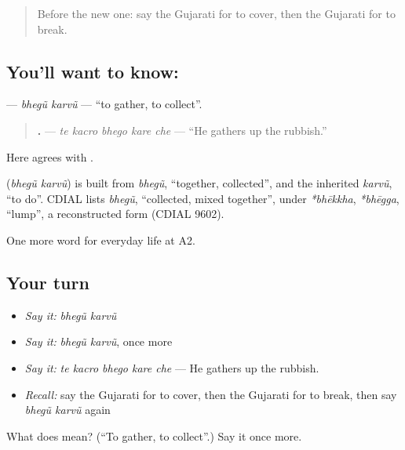 \label{lesson:GU-C161-bhegu-karvu}



\begin{quote}
Before the new one: say the Gujarati for to cover, then the Gujarati for to break.
\end{quote}

\subsection*{You'll want to know:  }
\textbf{ } — \emph{bhegũ karvũ} — \textquotedblleft{}to gather, to collect\textquotedblright{}.

\begin{quote}
\textbf{    .} — \emph{te kacro bhego kare che} — \textquotedblleft{}He gathers up the rubbish.\textquotedblright{}
\end{quote}

Here \textbf{} agrees with \textbf{}.

\begin{cousinweb}
\textbf{ } (\emph{bhegũ karvũ}) is built from \emph{bhegũ}, \textquotedblleft{}together, collected\textquotedblright{}, and the inherited \emph{karvũ}, \textquotedblleft{}to do\textquotedblright{}. CDIAL lists \emph{bhegũ}, \textquotedblleft{}collected, mixed together\textquotedblright{}, under \emph{*bhēkkha}, \emph{*bhēgga}, \textquotedblleft{}lump\textquotedblright{}, a reconstructed form (CDIAL 9602).
\end{cousinweb}

\begin{grammarlens}[title={What you've built}]
One more word for everyday life at A2.
\end{grammarlens}

\subsection*{Your turn}
\begin{itemize}
\raggedright
  \item \emph{Say it:} \emph{bhegũ karvũ}
  \item \emph{Say it:} \emph{bhegũ karvũ}, once more
  \item \emph{Say it:} \emph{te kacro bhego kare che} — He gathers up the rubbish.
  \item \emph{Recall:} say the Gujarati for to cover, then the Gujarati for to break, then say \emph{bhegũ karvũ} again
\end{itemize}

\begin{tcolorbox}[breakable,colback=teal!4,colframe=teal!35!black,title={Before you move on}]
What does   mean? (\textquotedblleft{}To gather, to collect\textquotedblright{}.) Say it once more.
\end{tcolorbox}
